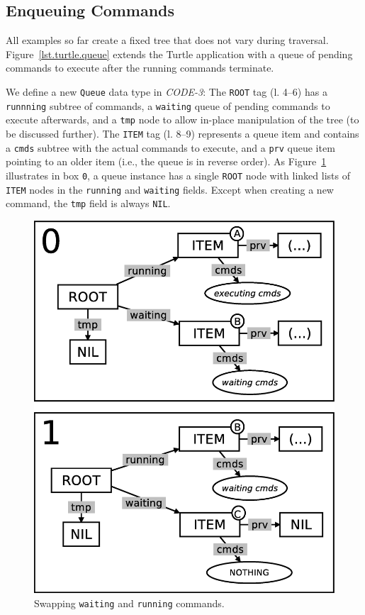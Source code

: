 \documentclass{sig-alternate}
\newcommand{\code}[1] {{\small{\texttt{#1}}}}
\begin{document}
\subsection{Enqueuing Commands}
\label{sub.enqueuing}

All examples so far create a fixed tree that does not vary during traversal.
%
Figure~\ref{lst.turtle.queue} extends the Turtle application with a queue of 
pending commands to execute after the running commands terminate.

We define a new \code{Queue} data type in \emph{CODE-3}:
The \code{ROOT} tag (l. 4--6) has a \code{runnning} subtree of commands, a 
\code{waiting} queue of pending commands to execute afterwards, and a 
\code{tmp} node to allow in-place manipulation of the tree (to be discussed 
further).
%
The \code{ITEM} tag (l. 8--9) represents a queue item and contains a 
\code{cmds} subtree with the actual commands to execute, and a \code{prv} queue 
item pointing to an older item (i.e., the queue is in reverse order).
%
As Figure~\ref{fig.queue-1} illustrates in box \code{0}, a queue instance has a 
single \code{ROOT} node with linked lists of \code{ITEM} nodes in the 
\code{running} and \code{waiting} fields.
Except when creating a new command, the \code{tmp} field is always \code{NIL}.

\begin{figure}[t]
\centering
\includegraphics[scale=0.24]{queue-fig-1.eps}
\caption{
Swapping \code{waiting} and \code{running} commands.
\label{fig.queue-1}
}
\end{figure}
\end{document}
